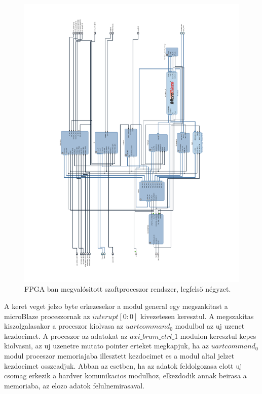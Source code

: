 \renewcommand{\img}{SajatRobot/FPGAmodulok/UartUML.jpg}
\renewcommand{\sources}{*}
\renewcommand{\captionn}{FPGA hardver/MicroBlaze processzor és ROS node közötti kommunikáció megvalósitása UART protokoll alapján }
\renewcommand{\figlabel}{FPGAuartRos}


\begin{figure}[H]
  \includegraphics[width=1.2\columnwidth]{tikz/VivadoHL.pdf}
  \caption{FPGA ban megvalósitott szoftproceszor rendszer, legfelső négyzet.}
  \label{fig:VivadoHl}
\end{figure}

A keret veget jelzo byte erkezesekor a modul general egy megszakitast a microBlaze proceszornak az $interupt[0:0]$ kivezetesen keresztul.
A megszakitas kiszolgalasakor a proceszor kiolvasa az $uartcommand_0$ modulbol az uj uzenet kezdocimet. A proceszor az adatokat az $axi\_bram\_ctrl\_1$ modulon keresztul kepes kiolvasni, az uj uzenetre mutato pointer erteket megkapjuk, ha az $uartcommand_0$ modul proceszor memoriajaba illesztett kezdocimet es a modul altal jelzet kezdocimet osszeadjuk.
Abban az esetben, ha az adatok feldolgozasa elott uj csomag erkezik a hardver komunikacios modulhoz, elkezdodik annak beirasa a memoriaba, az elozo adatok felulnemirasaval.

